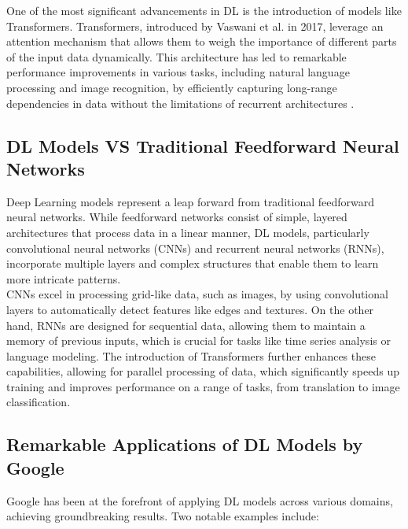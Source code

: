 \documentclass{article}
\begin{document}
One of the most significant advancements in DL is the introduction of models like Transformers. Transformers, introduced by Vaswani et al. in 2017, leverage an attention mechanism that allows them to weigh the importance of different parts of the input data dynamically. This architecture has led to remarkable performance improvements in various tasks, including natural language processing and image recognition, by efficiently capturing long-range dependencies in data without the limitations of recurrent architectures \cite{vaswani2017attention}.

\subsection{DL Models VS Traditional Feedforward Neural Networks}
Deep Learning models represent a leap forward from traditional feedforward neural networks. While feedforward networks consist of simple, layered architectures that process data in a linear manner, DL models, particularly convolutional neural networks (CNNs) and recurrent neural networks (RNNs), incorporate multiple layers and complex structures that enable them to learn more intricate patterns. 
\\

CNNs excel in processing grid-like data, such as images, by using convolutional layers to automatically detect features like edges and textures. On the other hand, RNNs are designed for sequential data, allowing them to maintain a memory of previous inputs, which is crucial for tasks like time series analysis or language modeling. The introduction of Transformers further enhances these capabilities, allowing for parallel processing of data, which significantly speeds up training and improves performance on a range of tasks, from translation to image classification.

\subsection{Remarkable Applications of DL Models by Google}
Google has been at the forefront of applying DL models across various domains, achieving groundbreaking results. Two notable examples include:
\end{document}
